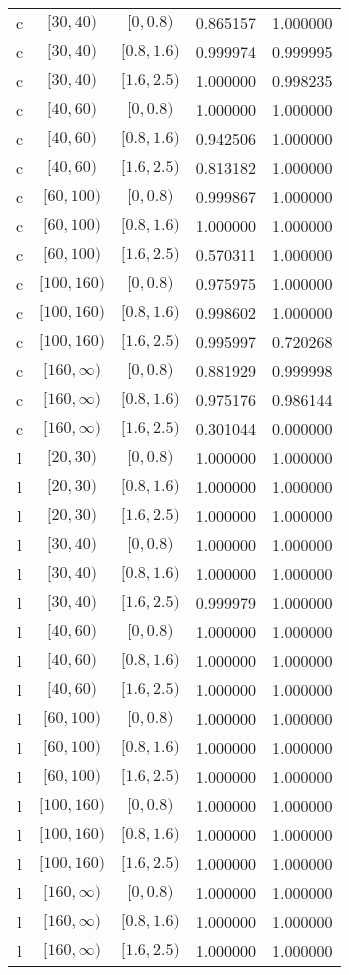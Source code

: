 \documentclass[12pt,a4paper]{article}
\begin{document}
\begin{table}[H]
\begin{center}
\begin{tabular}{ c | c | c | c | c }
		c & $[30,40)$ & $[0,0.8)$ & 0.865157 & 1.000000 \\
		c & $[30,40)$ & $[0.8,1.6)$ & 0.999974 & 0.999995 \\
		c & $[30,40)$ & $[1.6,2.5)$ & 1.000000 & 0.998235 \\
		c & $[40,60)$ & $[0,0.8)$ & 1.000000 & 1.000000 \\
		c & $[40,60)$ & $[0.8,1.6)$ & 0.942506 & 1.000000 \\
		c & $[40,60)$ & $[1.6,2.5)$ & 0.813182 & 1.000000 \\
		c & $[60,100)$ & $[0,0.8)$ & 0.999867 & 1.000000 \\
		c & $[60,100)$ & $[0.8,1.6)$ & 1.000000 & 1.000000 \\
		c & $[60,100)$ & $[1.6,2.5)$ & 0.570311 & 1.000000 \\
		c & $[100,160)$ & $[0,0.8)$ & 0.975975 & 1.000000 \\
		c & $[100,160)$ & $[0.8,1.6)$ & 0.998602 & 1.000000 \\
		c & $[100,160)$ & $[1.6,2.5)$ & 0.995997 & 0.720268 \\
		c & $[160,\infty)$ & $[0,0.8)$ & 0.881929 & 0.999998 \\
		c & $[160,\infty)$ & $[0.8,1.6)$ & 0.975176 & 0.986144 \\
		c & $[160,\infty)$ & $[1.6,2.5)$ & 0.301044 & 0.000000 \\ \hline
		l & $[20,30)$ & $[0,0.8)$ & 1.000000 & 1.000000 \\
		l & $[20,30)$ & $[0.8,1.6)$ & 1.000000 & 1.000000 \\
		l & $[20,30)$ & $[1.6,2.5)$ & 1.000000 & 1.000000 \\
		l & $[30,40)$ & $[0,0.8)$ & 1.000000 & 1.000000 \\
		l & $[30,40)$ & $[0.8,1.6)$ & 1.000000 & 1.000000 \\
		l & $[30,40)$ & $[1.6,2.5)$ & 0.999979 & 1.000000 \\
		l & $[40,60)$ & $[0,0.8)$ & 1.000000 & 1.000000 \\
		l & $[40,60)$ & $[0.8,1.6)$ & 1.000000 & 1.000000 \\
		l & $[40,60)$ & $[1.6,2.5)$ & 1.000000 & 1.000000 \\
		l & $[60,100)$ & $[0,0.8)$ & 1.000000 & 1.000000 \\
		l & $[60,100)$ & $[0.8,1.6)$ & 1.000000 & 1.000000 \\
		l & $[60,100)$ & $[1.6,2.5)$ & 1.000000 & 1.000000 \\
		l & $[100,160)$ & $[0,0.8)$ & 1.000000 & 1.000000 \\
		l & $[100,160)$ & $[0.8,1.6)$ & 1.000000 & 1.000000 \\
		l & $[100,160)$ & $[1.6,2.5)$ & 1.000000 & 1.000000 \\
		l & $[160,\infty)$ & $[0,0.8)$ & 1.000000 & 1.000000 \\
		l & $[160,\infty)$ & $[0.8,1.6)$ & 1.000000 & 1.000000 \\
		l & $[160,\infty)$ & $[1.6,2.5)$ & 1.000000 & 1.000000 \\
	\end{tabular}
\end{center}
\end{table}
\end{document}
